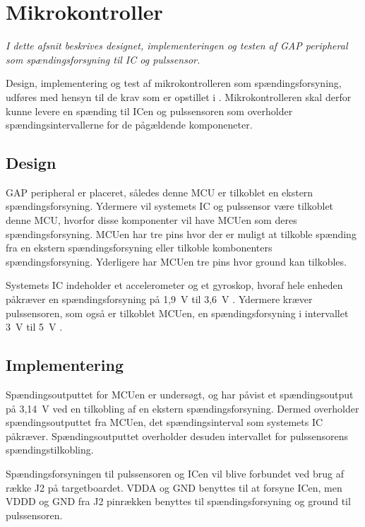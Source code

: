 \section{Mikrokontroller}
\textit{I dette afsnit beskrives designet, implementeringen og testen af GAP peripheral som spændingsforsyning til IC og pulssensor.}

Design, implementering og test af mikrokontrolleren som spændingsforsyning, udføres med hensyn til de krav som er opstillet i . Mikrokontrolleren skal derfor kunne levere en spænding til ICen og pulssensoren som overholder spændingsintervallerne for de pågældende komponeneter.

\subsection{Design}
GAP peripheral er placeret, således denne MCU er tilkoblet en ekstern spændingsforsyning. Ydermere vil systemets IC og pulssensor være tilkoblet denne MCU, hvorfor disse komponenter vil have MCUen som deres spændingsforsyning. \newline
MCUen har tre pins hvor der er muligt at tilkoble spænding fra en ekstern spændingsforsyning eller tilkoble kombonenters spændingsforsyning. Yderligere har MCUen tre pins hvor ground kan tilkobles. \citep{Semiconductor2016} 

Systemets IC indeholder et accelerometer og et gyroskop, hvoraf hele enheden påkræver en spændingsforsyning på 1,9~V til 3,6~V \citep{Jimb02016}.
Ydermere kræver pulssensoren, som også er tilkoblet MCUen, en spændingsforsyning i intervallet 3~V til 5~V \citep{Murphy2016}.

\subsection{Implementering}
Spændingsoutputtet for MCUen er undersøgt, og har påvist et spændingsoutput på 3,14~V ved en tilkobling af en ekstern spændingsforsyning. Dermed overholder spændingsoutputtet fra MCUen, det spændingsinterval som systemets IC påkræver. Spændingsoutputtet overholder desuden intervallet for pulssensorens spændingstilkobling. \newline

Spændingsforsyningen til pulssensoren og ICen vil blive forbundet ved brug af række J2 på targetboardet. VDDA og GND benyttes til at forsyne ICen, men VDDD og GND fra J2 pinrækken benyttes til spændingsforsyning og ground til pulssensoren. \newline


